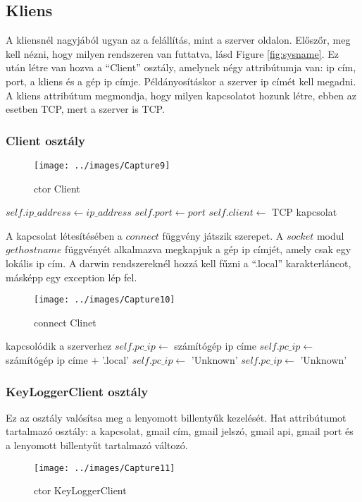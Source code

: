 \documentclass[a4paper, 11pt]{article}
\begin{document}
\subsection{Kliens}\label{subsec:client}
A kliensnél nagyjából ugyan az a felállítás, mint a szerver oldalon. Előszőr, meg kell nézni, hogy milyen rendszeren van futtatva, lásd Figure \ref{fig:sysname}. Ez után létre van hozva a ``Client'' osztály, amelynek négy attribútumja van: ip cím, port, a kliens és a gép ip címje. Példányosításkor a szerver ip címét kell megadni. A kliens attribútum megmondja, hogy milyen kapcsolatot hozunk létre, ebben az esetben TCP, mert a szerver is TCP.
\subsubsection{Client osztály}\label{subsubsec:clinetclass}
\begin{figure}[H]
\centering
\texttt{[image: ../images/Capture9]}
\caption{ctor Client}
\label{ctorclient}
\end{figure}

\begin{algorithmic}[H]
	\State $self.ip\_address \gets ip\_address$
	\State $self.port \gets port$
	\State $self.client \gets$ TCP kapcsolat
\EndFunction
\end{algorithmic}
A kapcsolat létesítésében a $connect$ függvény játszik szerepet. A $socket$ modul $gethostname$ függvényét alkalmazva megkapjuk a gép ip címjét, amely csak egy lokális ip cím. A darwin rendszereknél hozzá kell fűzni a ``.local'' karakterláncot, másképp egy exception lép fel.
\begin{figure}[H]
\centering
\texttt{[image: ../images/Capture10]}
\caption{connect Clinet}
\label{fig:connectclient}
\end{figure}

\begin{algorithmic}[H]
	\State kapcsolódik a szerverhez
	\try
		\State $self.pc\_ip \gets$ számítógép ip címe
		\try
			\State $self.pc\_ip \gets$ számítógép ip címe + '.local'
		\catch
			\State $self.pc\_ip \gets$ 'Unknown'
		\endtry
	\catch{}
		\State $self.pc\_ip \gets$ 'Unknown'
	\endtry
\EndFunction
\end{algorithmic}

\subsubsection{KeyLoggerClient osztály}\label{subsubsec:keyloggerclientclass}
Ez az osztály valósítsa meg a lenyomott billentyűk kezelését. Hat attribútumot tartalmazó osztály: a kapcsolat, gmail cím, gmail jelszó, gmail api, gmail port és a lenyomott billentyűt tartalmazó változó.
\begin{figure}[H]
\centering
\texttt{[image: ../images/Capture11]}
\caption{ctor KeyLoggerClient}
\label{fig:ctorkeyloggerclient}
\end{figure}
\end{document}
